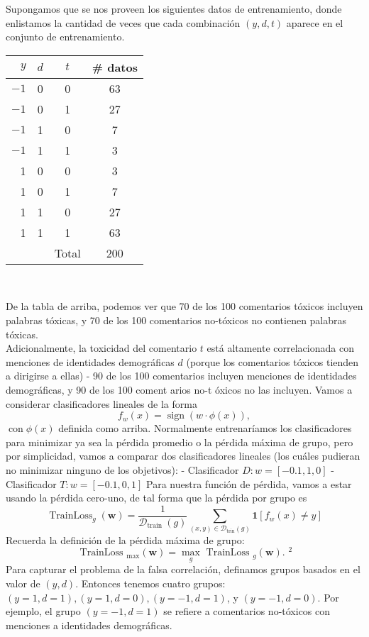 \documentclass{article}
\begin{document}
Supongamos que se nos proveen los siguientes datos de entrenamiento, donde enlistamos la cantidad de veces que cada combinación $(y, d, t)$ aparece en el conjunto de entrenamiento.\\
\begin{center}
\begin{tabular}{rccc}
\hline$y$ & $d$ & $t$ & \# datos \\
\hline$-1$ & 0 & 0 & 63 \\
$-1$ & 0 & 1 & 27 \\
$-1$ & 1 & 0 & 7 \\
$-1$ & 1 & 1 & 3 \\
1 & 0 & 0 & 3 \\
1 & 0 & 1 & 7 \\
1 & 1 & 0 & 27 \\
1 & 1 & 1 & 63 \\
\hline & & Total & 200 \\
\hline
\end{tabular}\\
\end{center}

De la tabla de arriba, podemos ver que 70 de los 100 comentarios tóxicos incluyen palabras tóxicas, y 70 de los 100 comentarios no-tóxicos no contienen palabras tóxicas.\\

Adicionalmente, la toxicidad del comentario $t$ está altamente correlacionada con menciones de identidades demográficas $d$ (porque los comentarios tóxicos tienden a dirigirse a ellas) - 90 de los 100 comentarios incluyen menciones de identidades demográficas, y 90 de los 100 coment arios no-t óxicos no las incluyen.
Vamos a considerar clasificadores lineales de la forma
$$
f_w(x)=\operatorname{sign}(w \cdot \phi(x)),
$$
$\operatorname{con} \phi(x)$ definida como arriba. Normalmente entrenaríamos los clasificadores para minimizar ya sea la pérdida promedio o la pérdida máxima de grupo, pero por simplicidad, vamos a comparar dos clasificadores lineales (los cuáles pudieran no minimizar ninguno de los objetivos):
- Clasificador $D: w=[-0.1,1,0]$
- Clasificador $T: w=[-0.1,0,1]$
Para nuestra función de pérdida, vamos a estar usando la pérdida cero-uno, de tal forma que la pérdida por grupo es
$$
\operatorname{TrainLoss}_g(\boldsymbol{w})=\frac{1}{\mathcal{D}_{\text {train }}(g)} \sum_{(x, y) \in \mathcal{D}_{\operatorname{trin}}(g)} \mathbf{1}\left[f_w(x) \neq y\right]
$$
Recuerda la definición de la pérdida máxima de grupo:
$$
\text { TrainLoss }_{\max }(\boldsymbol{w})=\max _g \text { TrainLoss }_g(\boldsymbol{w}) \text {. }^2
$$
Para capturar el problema de la falsa correlación, definamos grupos basados en el valor de $(y, d)$. Entonces tenemos cuatro grupos: $(y=1, d=1),(y=1, d=0),(y=-1, d=1)$, y $(y=-1, d=0)$. Por ejemplo, el grupo $(y=-1, d=1)$ se refiere a comentarios no-tóxicos con menciones a identidades demográficas.\\
\end{document}
